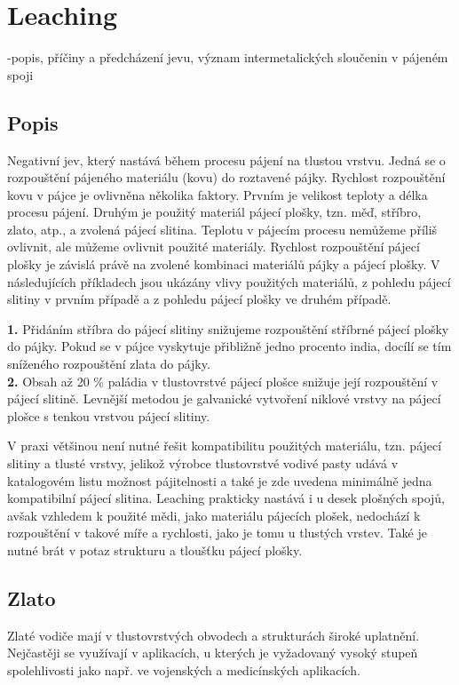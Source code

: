 \section{Leaching}
-popis, příčiny a předcházení jevu, význam intermetalických sloučenin v pájeném spoji

\subsection{Popis}
Negativní jev, který nastává během procesu pájení na tlustou vrstvu. Jedná se o rozpouštění pájeného materiálu (kovu) do roztavené pájky. Rychlost rozpouštění kovu v pájce je ovlivněna několika faktory. Prvním je velikost teploty a délka procesu
pájení. Druhým je použitý materiál pájecí plošky, tzn. měď, stříbro, zlato, atp., a zvolená pájecí slitina. Teplotu v pájecím procesu nemůžeme příliš ovlivnit, ale můžeme ovlivnit použité materiály. Rychlost rozpouštění pájecí plošky je závislá právě na zvolené kombinaci materiálů pájky a pájecí plošky. V následujících příkladech jsou ukázány vlivy použitých materiálů, z pohledu pájecí slitiny v prvním případě a z pohledu pájecí plošky ve druhém případě.

\textbf{1.} Přidáním stříbra do pájecí slitiny snižujeme rozpouštění stříbrné pájecí plošky do pájky. Pokud
se v pájce vyskytuje přibližně jedno procento india, docílí se tím sníženého rozpouštění zlata do pájky.\\
\textbf{2.} Obsah až 20 \% paládia v tlustovrstvé pájecí plošce snižuje její rozpouštění v pájecí slitině.
Levnější metodou je galvanické vytvoření niklové vrstvy na pájecí plošce s tenkou vrstvou pájecí slitiny.

V praxi většinou není nutné řešit kompatibilitu použitých materiálu, tzn. pájecí slitiny a tlusté vrstvy, jelikož výrobce tlustovrstvé vodivé pasty udává v katalogovém listu možnost pájitelnosti a také je zde uvedena minimálně jedna kompatibilní pájecí slitina. Leaching prakticky nastává i u desek plošných spojů, avšak vzhledem k použité mědi, jako materiálu pájecích plošek, nedochází k rozpouštění v takové míře a rychlosti, jako je tomu u tlustých vrstev. Také je nutné brát v potaz strukturu a tloušťku pájecí plošky.

\subsection{Zlato}
Zlaté vodiče mají v tlustovrstvých obvodech a strukturách široké uplatnění. Nejčastěji se využívají v aplikacích, u kterých je vyžadovaný vysoký stupeň spolehlivosti jako např. ve vojenských a medicínských aplikacích.

